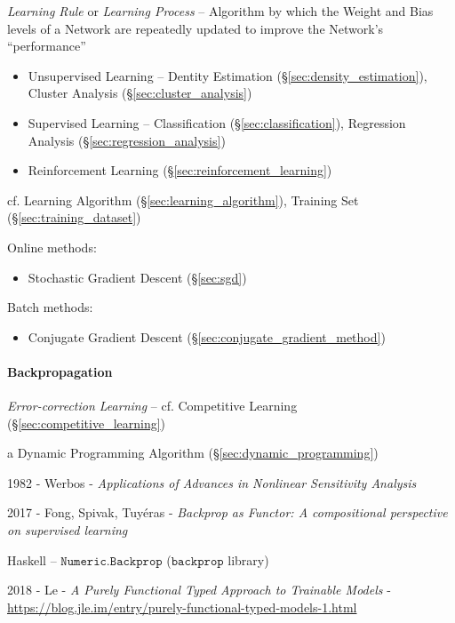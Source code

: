 \emph{Learning Rule} or \emph{Learning Process} -- Algorithm by which the Weight
and Bias levels of a Network are repeatedly updated to improve the Network's
``performance''

\begin{itemize}
  \item Unsupervised Learning -- Dentity Estimation
    (\S\ref{sec:density_estimation}), Cluster Analysis
    (\S\ref{sec:cluster_analysis})
  \item Supervised Learning -- Classification (\S\ref{sec:classification}),
    Regression Analysis (\S\ref{sec:regression_analysis})
  \item Reinforcement Learning (\S\ref{sec:reinforcement_learning})
\end{itemize}

\fist cf. Learning Algorithm (\S\ref{sec:learning_algorithm}),
Training Set (\S\ref{sec:training_dataset})

Online methods:
\begin{itemize}
  \item Stochastic Gradient Descent (\S\ref{sec:sgd})
\end{itemize}

Batch methods:
\begin{itemize}
  \item Conjugate Gradient Descent (\S\ref{sec:conjugate_gradient_method})
\end{itemize}



\paragraph{Backpropagation}\label{sec:backpropagation}\hfill

\emph{Error-correction Learning} -- cf. Competitive Learning
(\S\ref{sec:competitive_learning})

a Dynamic Programming Algorithm (\S\ref{sec:dynamic_programming})

1982 - Werbos -
\emph{Applications of Advances in Nonlinear Sensitivity Analysis}

2017 - Fong, Spivak, Tuy\'eras - \emph{Backprop as Functor: A compositional
  perspective on supervised learning}

Haskell -- $\mathtt{Numeric.Backprop}$ ($\mathtt{backprop}$ library)

2018 - Le - \emph{A Purely Functional Typed Approach to Trainable Models} -
\url{https://blog.jle.im/entry/purely-functional-typed-models-1.html}

